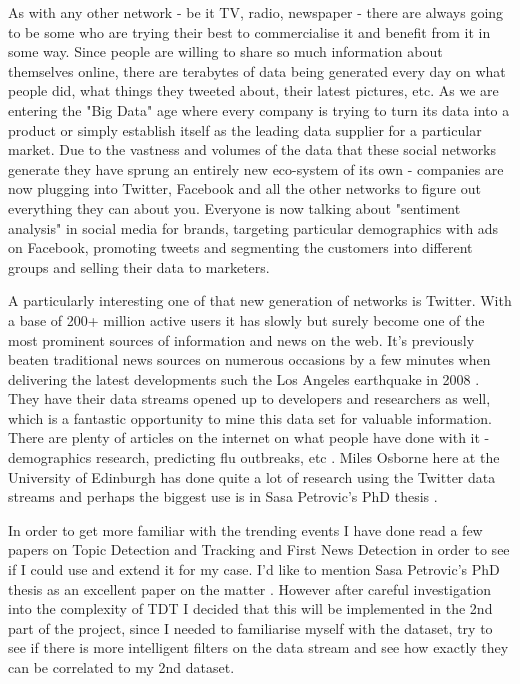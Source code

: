 \documentclass[minf,frontabs,twoside,singlespacing,parskip]{infthesis}
\begin{document}
As with any other network - be it TV, radio, newspaper - there are always going to be some who are trying their best to commercialise it and benefit from it in some way. Since people are willing to share so much information about themselves online, there are terabytes of data being generated every day on what people did, what things they tweeted about, their latest pictures, etc. As we are entering the "Big Data" age where every company is trying to turn its data into a product or simply establish itself as the leading data supplier for a particular market. Due to the vastness and volumes of the data that these social networks generate they have sprung an entirely new eco-system of its own - companies are now plugging into Twitter, Facebook and all the other networks to figure out everything they can about you. Everyone is now talking about "sentiment analysis" in social media for brands, targeting particular demographics with ads on Facebook, promoting tweets and segmenting the customers into different groups and selling their data to marketers.


A particularly interesting one of that new generation of networks is Twitter. With a base of 200+ million active users it has slowly but surely become one of the most prominent sources of information and news on the web. It's previously beaten traditional news sources on numerous occasions by a few minutes when delivering the latest developments such the Los Angeles earthquake in 2008  \cite{TwitterNewsWire}. They have their data streams opened up to developers and researchers as well, which is a fantastic opportunity to mine this data set for valuable information. There are plenty of articles on the internet on what people have done with it - demographics research, predicting flu outbreaks, etc \cite{TwitterResearch}.  Miles Osborne here at the University of Edinburgh has done quite a lot of research using the Twitter data streams  \cite{Miles} and perhaps the biggest use is in Sasa Petrovic's PhD thesis  \cite{Petrovic2012}.


In order to get more familiar with the trending events I have done read a few papers on Topic Detection and Tracking and First News Detection in order to see if I could use and extend it for my case. I'd like to mention Sasa Petrovic's PhD thesis as an excellent paper on the matter \cite{Petrovic2012}.  However after careful investigation into the complexity of TDT I decided that this will be implemented in the 2nd part of the project, since I needed to familiarise myself with the dataset, try to see if there is more intelligent filters on the data stream and see how exactly they can be correlated to my 2nd dataset.
\end{document}
